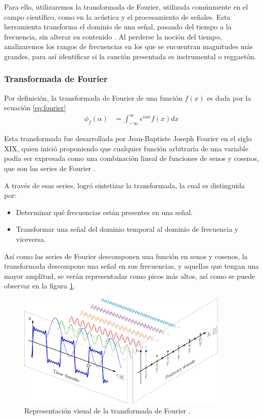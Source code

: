 \documentclass[12pt, letterpaper]{article}
\begin{document}
\noindent Para ello, utilizaremos la transformada de Fourier, utilizada
comúnmente en el campo científico, como en la acústica y el procesamiento de señales.
Esta herramienta transforma el dominio de una señal, pasando del tiempo a la frecuencia,
sin alterar su contenido \cite{Bernal-1999}.
Al perderse la noción del tiempo, analizaremos los rangos de frecuencias en los
que se encuentran magnitudes más grandes, para así identificar si la canción presentada
es instrumental o reggaetón.

\subsubsection{Transformada de Fourier}

Por definición, la transformada de Fourier de una función $f(x)$ es dada por la ecuación \ref{eq:fourier}
\begin{align}
	\phi_f(\alpha) &= \int_{-\infty}^{\infty} e^{i\alpha x} f(x) dx
	\label{eq:fourier}
\end{align}

\noindent Esta transformada fue desarrollada por Jean-Baptiste Joseph Fourier en el siglo XIX,
quien inició proponiendo que cualquier función arbitraria de una variable
podía ser expresada como una combinación lineal de funciones de senos y cosenos,
que son las series de Fourier \cite{OGorman-2023}. \medskip

\noindent A través de esas series, logró sintetizar la transformada, la cual
es distinguida por:
\begin{itemize}
  \item Determinar qué frecuencias están presentes en una señal.
  \item Transformar una señal del dominio temporal al dominio de frecuencia y viceversa.
\end{itemize}

\noindent Así como las series de Fourier descomponen una función en senos y cosenos, la
transformada descompone una señal en sus frecuencias, y aquellas que tengan una mayor
amplitud, se verán representadas como picos más altos, así como se puede observar en
la figura \ref{fig:fourier}.

\begin{figure}[H]
  \centering
  \includegraphics[width=0.9\textwidth]{FourierSeries_Freq.png}
  \caption{Representación visual de la transformada de Fourier \cite{OGorman-2023}.}
  \label{fig:fourier}
\end{figure}
\end{document}
